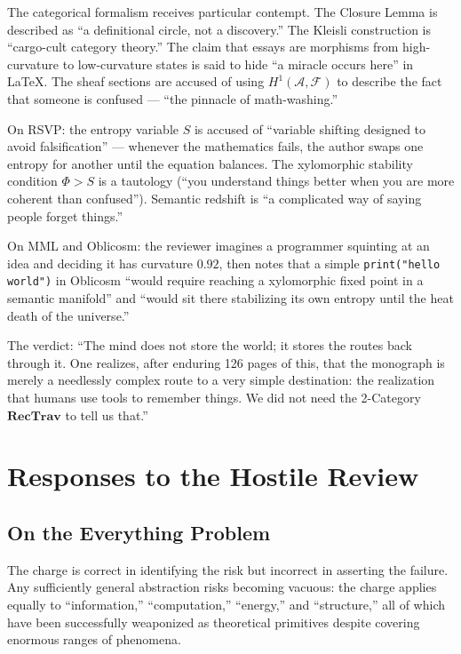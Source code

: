 \documentclass[12pt,oneside]{book}
\theoremstyle{plain}
\theoremstyle{definition}
\theoremstyle{plain}
\newcommand{\RecTrav}{\mathbf{RecTrav}}
\newcommand{\cA}{\mathcal{A}}
\begin{document}
The categorical formalism receives particular contempt. The Closure Lemma is described as ``a definitional circle, not a discovery.'' The Kleisli construction is ``cargo-cult category theory.'' The claim that essays are morphisms from high-curvature to low-curvature states is said to hide ``a miracle occurs here'' in \LaTeX. The sheaf sections are accused of using $H^1(\cA, \mathcal{F})$ to describe the fact that someone is confused — ``the pinnacle of math-washing.''

On RSVP: the entropy variable $S$ is accused of ``variable shifting designed to avoid falsification'' — whenever the mathematics fails, the author swaps one entropy for another until the equation balances. The xylomorphic stability condition $\Phi > S$ is a tautology (``you understand things better when you are more coherent than confused''). Semantic redshift is ``a complicated way of saying people forget things.''

On MML and Oblicosm: the reviewer imagines a programmer squinting at an idea and deciding it has curvature $0.92$, then notes that a simple \texttt{print("hello world")} in Oblicosm ``would require reaching a xylomorphic fixed point in a semantic manifold'' and ``would sit there stabilizing its own entropy until the heat death of the universe.''

The verdict: ``The mind does not store the world; it stores the routes back through it. One realizes, after enduring 126 pages of this, that the monograph is merely a needlessly complex route to a very simple destination: the realization that humans use tools to remember things. We did not need the 2-Category $\RecTrav$ to tell us that.''

\section{Responses to the Hostile Review}

\subsection{On the Everything Problem}

The charge is correct in identifying the risk but incorrect in asserting the failure. Any sufficiently general abstraction risks becoming vacuous: the charge applies equally to ``information,'' ``computation,'' ``energy,'' and ``structure,'' all of which have been successfully weaponized as theoretical primitives despite covering enormous ranges of phenomena.
\end{document}
